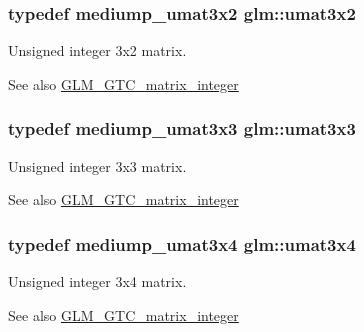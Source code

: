 \subsubsection[{\texorpdfstring{umat3x2}{umat3x2}}]{\setlength{\rightskip}{0pt plus 5cm}typedef mediump\+\_\+umat3x2 {\bf glm\+::umat3x2}}\hypertarget{group__gtc__matrix__integer_ga257300f2710612877ef45438a366e308}{}\label{group__gtc__matrix__integer_ga257300f2710612877ef45438a366e308}
Unsigned integer 3x2 matrix. \begin{DoxySeeAlso}{See also}
\hyperlink{group__gtc__matrix__integer}{G\+L\+M\+\_\+\+G\+T\+C\+\_\+matrix\+\_\+integer} 
\end{DoxySeeAlso}
\subsubsection[{\texorpdfstring{umat3x3}{umat3x3}}]{\setlength{\rightskip}{0pt plus 5cm}typedef mediump\+\_\+umat3x3 {\bf glm\+::umat3x3}}\hypertarget{group__gtc__matrix__integer_gab80b6501ba1b2c40119a0f2d256f4c97}{}\label{group__gtc__matrix__integer_gab80b6501ba1b2c40119a0f2d256f4c97}
Unsigned integer 3x3 matrix. \begin{DoxySeeAlso}{See also}
\hyperlink{group__gtc__matrix__integer}{G\+L\+M\+\_\+\+G\+T\+C\+\_\+matrix\+\_\+integer} 
\end{DoxySeeAlso}
\subsubsection[{\texorpdfstring{umat3x4}{umat3x4}}]{\setlength{\rightskip}{0pt plus 5cm}typedef mediump\+\_\+umat3x4 {\bf glm\+::umat3x4}}\hypertarget{group__gtc__matrix__integer_ga5410857d098a989a30b4017100bc2ff7}{}\label{group__gtc__matrix__integer_ga5410857d098a989a30b4017100bc2ff7}
Unsigned integer 3x4 matrix. \begin{DoxySeeAlso}{See also}
\hyperlink{group__gtc__matrix__integer}{G\+L\+M\+\_\+\+G\+T\+C\+\_\+matrix\+\_\+integer} 
\end{DoxySeeAlso}
